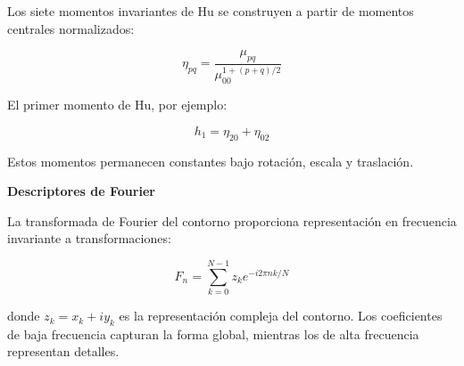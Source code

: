 Los siete momentos invariantes de Hu se construyen a partir de momentos centrales normalizados:

\begin{equation}
\eta_{pq} = \frac{\mu_{pq}}{\mu_{00}^{1 + (p+q)/2}}
\end{equation}

El primer momento de Hu, por ejemplo:

\begin{equation}
h_1 = \eta_{20} + \eta_{02}
\end{equation}

Estos momentos permanecen constantes bajo rotación, escala y traslación.

\textbf{Descriptores de Fourier}

La transformada de Fourier del contorno proporciona representación en frecuencia invariante a transformaciones:

\begin{equation}
F_n = \sum_{k=0}^{N-1} z_k e^{-i2\pi nk/N}
\end{equation}

donde $z_k = x_k + iy_k$ es la representación compleja del contorno. Los coeficientes de baja frecuencia capturan la forma global, mientras los de alta frecuencia representan detalles.
